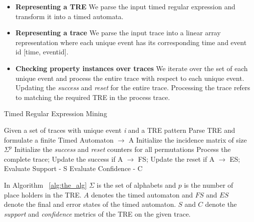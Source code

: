 \documentclass[]{sigplanconf}
\begin{document}
\begin{itemize}
\item \textbf{Representing a TRE} We parse the input timed regular expression and transform it into a timed automata.
\item \textbf{Representing a trace} We parse the input trace into a  linear array representation where each unique event has its corresponding time and event id [time, eventid].
\item \textbf{Checking property instances over traces} We iterate over the set of each unique event and process the entire trace with respect to each unique event. Updating the \emph{success} and \emph{reset} for the entire trace. Processing the trace refers to matching the required TRE in the process trace.
\end{itemize}


\begin{algorithm}[h]
    \caption{Timed Regular Expression Mining}\label{alg:the_alg}
    \begin{algorithmic}[1]
     \Require  Given a set of traces with unique event \emph{i} and a TRE pattern
     \Ensure Parse TRE and formulate a finite Timed Automaton $\rightarrow$ A
     \State Initialize the incidence matrix of size $\Sigma^p$
     \State Initialize the \emph{success} and \emph{reset} counters for all permutations
        \State Process the complete trace;
        \State Update the success if A $\rightarrow$ FS;
        \State Update the reset if A $\rightarrow$ ES;
     \EndFor
     \State Evaluate Support - S
     \State Evaluate Confidence - C
    \end{algorithmic}
\end{algorithm}

In Algorithm ~\ref{alg:the_alg} $\Sigma$ is the set of alphabets and $p$ is the number of place holders in the TRE. $A$ denotes the timed automaton and $FS$ and $ES$ denote the final and error states of the timed automaton. $S$ and $C$ denote the \emph{support} and \emph{confidence} metrics of the TRE on the given trace.
\end{document}
